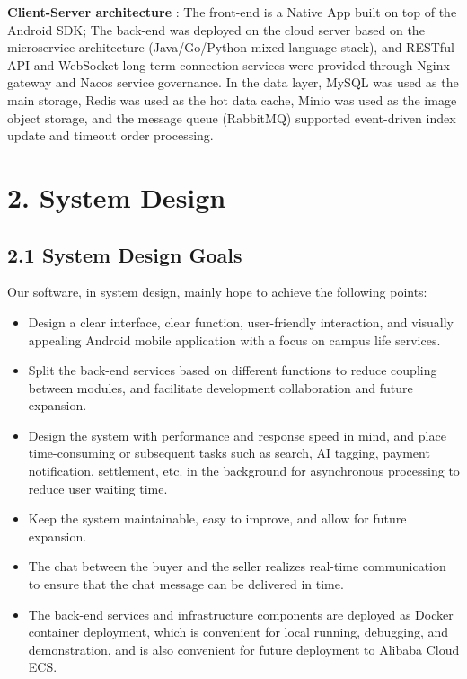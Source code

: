 \documentclass{article}
\begin{document}
\textbf{ Client-Server architecture } : The front-end is a Native App built on top of the Android SDK; The back-end was deployed on the cloud server based on the microservice architecture (Java/Go/Python mixed language stack), and RESTful API and WebSocket long-term connection services were provided through Nginx gateway and Nacos service governance. In the data layer, MySQL was used as the main storage, Redis was used as the hot data cache, Minio was used as the image object storage, and the message queue (RabbitMQ) supported event-driven index update and timeout order processing.

\section{2. System Design}

\subsection{2.1 System Design Goals}

Our software, in system design, mainly hope to achieve the following points:

\begin{itemize}
    \item Design a clear interface, clear function, user-friendly interaction, and visually appealing Android mobile application with a focus on campus life services.
    \item Split the back-end services based on different functions to reduce coupling between modules, and facilitate development collaboration and future expansion.
    \item Design the system with performance and response speed in mind, and place time-consuming or subsequent tasks such as search, AI tagging, payment notification, settlement, etc. in the background for asynchronous processing to reduce user waiting time.
    \item Keep the system maintainable, easy to improve, and allow for future expansion.
    \item The chat between the buyer and the seller realizes real-time communication to ensure that the chat message can be delivered in time.
    \item The back-end services and infrastructure components are deployed as Docker container deployment, which is convenient for local running, debugging, and demonstration, and is also convenient for future deployment to Alibaba Cloud ECS.
\end{itemize}
\end{document}
